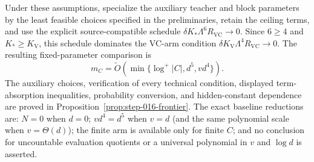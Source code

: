 \begin{corollary}\label{cor:frontier}
Under these assumptions, specialize the auxiliary teacher and block
parameters by the least feasible choices specified in the preliminaries,
retain the ceiling terms, and use the explicit source-compatible schedule
$\delta K_*\Lambda^{6}R_{\mathrm{VC}}\to0$.  Since $6\ge4$ and
$K_*\ge K_{\mathrm V}$, this schedule dominates the VC-arm condition
$\delta K_{\mathrm V}\Lambda^{4}R_{\mathrm{VC}}\to0$.  The resulting fixed-parameter
comparison is
\[
 m_C=\widetilde O\!\left(\min\{\log^+|C|,d^5,vd^4\}\right).
\]
The auxiliary choices, verification of every technical condition, displayed
term-absorption inequalities, probability conversion, and hidden-constant
dependence are proved in Proposition~\ref{prop:step-016-frontier}.
The exact baseline reductions are: $N=0$ when $d=0$; $vd^4=d^5$ when
$v=d$ (and the same polynomial scale when $v=\Theta(d)$); the finite arm is
available only for finite $C$; and no conclusion for uncountable evaluation
quotients or a universal polynomial in $v$ and $\log d$ is asserted.
\end{corollary}
